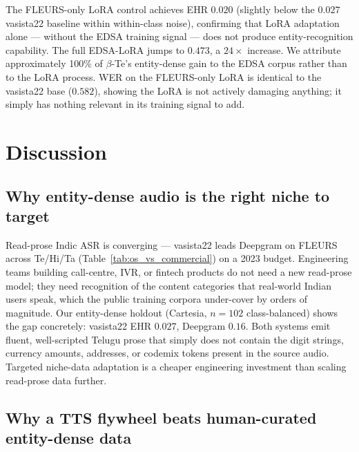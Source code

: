 \documentclass[conference,a4paper]{IEEEtran}
\begin{document}
The FLEURS-only LoRA control achieves EHR $0.020$ (slightly below the $0.027$ vasista22 baseline within within-class noise), confirming that LoRA adaptation alone --- without the EDSA training signal --- does not produce entity-recognition capability. The full EDSA-LoRA jumps to $0.473$, a $24\times$ increase. We attribute approximately 100\% of $\beta$-Te's entity-dense gain to the EDSA corpus rather than to the LoRA process. WER on the FLEURS-only LoRA is identical to the vasista22 base ($0.582$), showing the LoRA is not actively damaging anything; it simply has nothing relevant in its training signal to add.

\section{Discussion}\label{sec:discussion}

\subsection{Why entity-dense audio is the right niche to target}

Read-prose Indic ASR is converging --- vasista22 leads Deepgram on FLEURS across Te/Hi/Ta (Table~\ref{tab:os_vs_commercial}) on a 2023 budget. Engineering teams building call-centre, IVR, or fintech products do not need a new read-prose model; they need recognition of the content categories that real-world Indian users speak, which the public training corpora under-cover by orders of magnitude. Our entity-dense holdout (Cartesia, $n=102$ class-balanced) shows the gap concretely: vasista22 EHR $0.027$, Deepgram $0.16$. Both systems emit fluent, well-scripted Telugu prose that simply does not contain the digit strings, currency amounts, addresses, or codemix tokens present in the source audio. Targeted niche-data adaptation is a cheaper engineering investment than scaling read-prose data further.

\subsection{Why a TTS flywheel beats human-curated entity-dense data}
\end{document}
